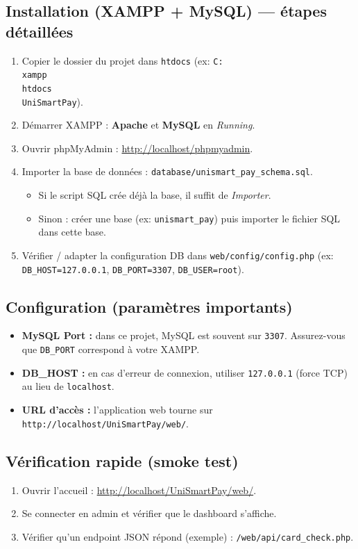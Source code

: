 \documentclass[11pt,a4paper]{article}
\begin{document}
\subsection{Installation (XAMPP + MySQL) — étapes détaillées}
\begin{enumerate}
  \item Copier le dossier du projet dans \texttt{htdocs} (ex: \texttt{C:\\xampp\\htdocs\\UniSmartPay}).
  \item Démarrer XAMPP : \textbf{Apache} et \textbf{MySQL} en \textit{Running}.
  \item Ouvrir phpMyAdmin : \url{http://localhost/phpmyadmin}.
  \item Importer la base de données : \texttt{database/unismart_pay_schema.sql}.
  \begin{itemize}
    \item Si le script SQL crée déjà la base, il suffit de \textit{Importer}.
    \item Sinon : créer une base (ex: \texttt{unismart\_pay}) puis importer le fichier SQL dans cette base.
  \end{itemize}
  \item Vérifier / adapter la configuration DB dans \texttt{web/config/config.php} (ex: \texttt{DB\_HOST=127.0.0.1}, \texttt{DB\_PORT=3307}, \texttt{DB\_USER=root}).
\end{enumerate}

\subsection{Configuration (paramètres importants)}
\begin{itemize}
  \item \textbf{MySQL Port :} dans ce projet, MySQL est souvent sur \texttt{3307}. Assurez-vous que \texttt{DB\_PORT} correspond à votre XAMPP.
  \item \textbf{DB\_HOST :} en cas d’erreur de connexion, utiliser \texttt{127.0.0.1} (force TCP) au lieu de \texttt{localhost}.
  \item \textbf{URL d’accès :} l’application web tourne sur \texttt{http://localhost/UniSmartPay/web/}.
\end{itemize}

\subsection{Vérification rapide (smoke test)}
\begin{enumerate}
  \item Ouvrir l’accueil : \url{http://localhost/UniSmartPay/web/}.
  \item Se connecter en admin et vérifier que le dashboard s’affiche.
  \item Vérifier qu’un endpoint JSON répond (exemple) : \texttt{/web/api/card\_check.php}.
\end{enumerate}
\end{document}
